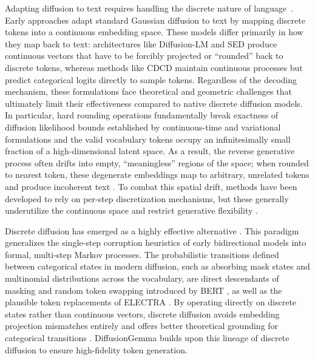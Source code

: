 \documentclass[11pt, a4paper, logo, copyright, gdm]{google}
\begin{document}
Adapting diffusion to text requires handling the discrete nature of language~\citep{yi2024diffusion}. Early approaches adapt standard Gaussian diffusion to text by mapping discrete tokens into a continuous embedding space. These models differ primarily in how they map back to text: architectures like Diffusion-LM \citep{li2022diffusionlm} and SED \citep{strudel2022self} produce continuous vectors that have to be forcibly projected or ``rounded'' back to discrete tokens, whereas methods like CDCD \citep{dieleman2022continuous} maintain continuous processes but predict categorical logits directly to sample tokens. Regardless of the decoding mechanism, these formulations face theoretical and geometric challenges that ultimately limit their effectiveness compared to native discrete diffusion models. In particular, hard rounding operations fundamentally break exactness of diffusion likelihood bounds established by continuous-time and variational formulations \citep{kingma2021variational} and the valid vocabulary tokens occupy an infinitesimally small fraction of a high-dimensional latent space. As a result, the reverse generative process often drifts into empty, ``meaningless'' regions of the space; when rounded to nearest token, these degenerate embeddings map to arbitrary, unrelated tokens and produce incoherent text \citep{shabalin2025tencdm, meshchaninov2025cosmos}. To combat this spatial drift, methods have been developed to rely on per-step discretization mechanisms, but these generally underutilize the continuous space and restrict generative flexibility \citep{hu2026elf}.

Discrete diffusion has emerged as a highly effective alternative \citep{austin2021structured, sahoo2024simple, lou2024discrete, zhao2024unified}. This paradigm generalizes the single-step corruption heuristics of early bidirectional models into formal, multi-step Markov processes. The probabilistic transitions defined between categorical states in modern diffusion, such as absorbing mask states and multinomial distributions across the vocabulary, are direct descendants of masking and random token swapping introduced by BERT \citep{devlin2019bert, liu2019roberta, sanh2019distilbert}, as well as the plausible token replacements of ELECTRA \citep{clark2020electra}. By operating directly on discrete states rather than continuous vectors, discrete diffusion avoids embedding projection mismatches entirely and offers better theoretical grounding for categorical transitions \citep{gat2024discrete}. DiffusionGemma builds upon this lineage of discrete diffusion to ensure high-fidelity token generation.
\end{document}
